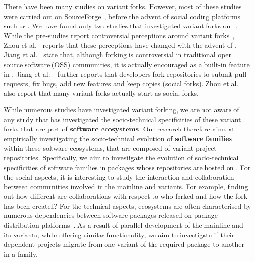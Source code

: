 There have been many studies on variant forks. However, most of these studies were carried out on \textsf{SourceForge}~\cite{Linus:2012Perspectives,Gregorio:2012,Viseur:2012Forks,Linus:2013CodeForking,Laurent:2008,Linus:2011ToFork}, before the advent of social coding platforms such as \gh.
We have found only two studies that investigated variant forks on \gh~\cite{businge2018appfamilies,Zhou:2020}.
While the pre-\gh studies report controversial perceptions around variant forks~\cite{Chua:Forking:2017,Dixion:2009Forks,Ernst:2010,Linus:2011ToFork,Linus:2014Hackers,Raymond:Cathedral:2001}, Zhou et al.~\cite{Zhou:2020} reports that these perceptions have changed with the advent of \gh. Jiang et al.~\cite{Lo:2017} state that, although forking is controversial in traditional open source software (OSS) communities, it is actually encouraged as a built-in feature in \gh. Jiang et al. ~\cite{Lo:2017} further reports that developers fork repositories to submit pull requests, fix bugs, add new features and keep copies (social forks).
Zhou et al.~\cite{Zhou:2020} also report that many variant forks actually start as social forks.

While numerous studies have investigated variant forking, we are not aware of any study that has investigated the socio-technical specificities of these variant forks that are part of \textbf{software ecosystems}.
Our research therefore aims at empirically investigating the socio-technical evolution of \textbf{software families} within these software ecosystems, that are composed of variant project repositories. Specifically, we aim to investigate the evolution of socio-technical specificities of software families in \npm \js packages whose repositories are hosted on \gh.
For the social aspects, it is interesting to study the interaction and collaboration between communities involved in the mainline and variants.
For example, finding out how different are collaborations with respect to who forked and how the fork has been created?
For the technical aspects, ecosystems are often characterised by numerous dependencies between software packages released on package distribution platforms~\cite{decan:2016:ECSAW}. 
As a result of parallel development of the mainline and its variants, while offering similar functionality, we aim to investigate if their dependent projects migrate from one variant of the required package to another in a family.

